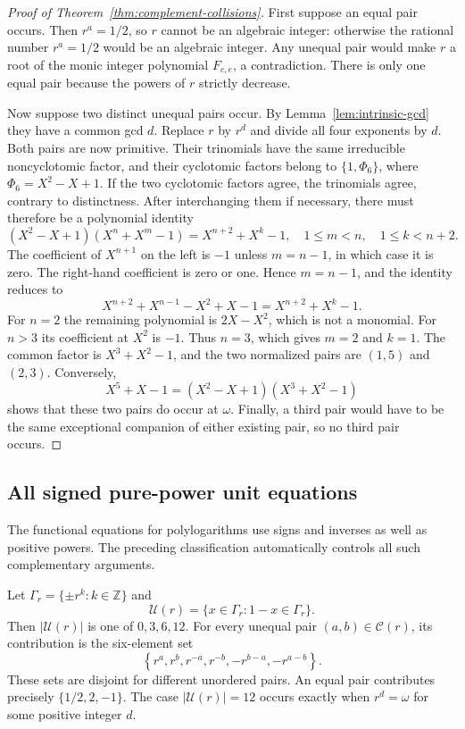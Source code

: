 \begin{proof}[Proof of Theorem~\ref{thm:complement-collisions}]
First suppose an equal pair occurs.  Then $r^a=1/2$, so $r$ cannot
be an algebraic integer: otherwise the rational number $r^a=1/2$
would be an algebraic integer.  Any unequal pair would make $r$ a
root of the monic integer polynomial $F_{c,e}$, a contradiction.
There is only one equal pair because the powers of $r$ strictly
decrease.

Now suppose two distinct unequal pairs occur.  By
Lemma~\ref{lem:intrinsic-gcd} they have a common gcd $d$.
Replace $r$ by $r^d$ and divide all four exponents by $d$.
Both pairs are now primitive.  Their trinomials have the same
irreducible noncyclotomic factor, and their cyclotomic factors belong
to $\{1,\Phi_6\}$, where $\Phi_6=X^2-X+1$.
If the two cyclotomic factors agree, the trinomials agree, contrary
to distinctness.  After interchanging them if necessary, there must
therefore be a polynomial identity
\begin{equation}
(X^2-X+1)(X^n+X^m-1)=X^{n+2}+X^k-1,
\quad 1\le m<n,\quad 1\le k<n+2.
\label{eq:primitive-collision-factor}
\end{equation}
The coefficient of $X^{n+1}$ on the left is $-1$ unless
$m=n-1$, in which case it is zero.  The right-hand coefficient is
zero or one.  Hence $m=n-1$, and the identity reduces to
\[
X^{n+2}+X^{n-1}-X^2+X-1=X^{n+2}+X^k-1.
\]
For $n=2$ the remaining polynomial is $2X-X^2$, which is not a
monomial.  For $n>3$ its coefficient at $X^2$ is $-1$.
Thus $n=3$, which gives $m=2$ and $k=1$.
The common factor is $X^3+X^2-1$, and the two normalized pairs are
$(1,5)$ and $(2,3)$.  Conversely,
\[
X^5+X-1=(X^2-X+1)(X^3+X^2-1)
\]
shows that these two pairs do occur at $\omega$.
Finally, a third pair would have to be the same exceptional companion
of either existing pair, so no third pair occurs.
\end{proof}

\subsection{All signed pure-power unit equations}

The functional equations for polylogarithms use signs and inverses as
well as positive powers.  The preceding classification automatically
controls all such complementary arguments.

\begin{corollary}
\label{cor:signed-unit-count}
Let $\Gamma_r=\{\pm r^k:k\in\mathbb Z\}$ and
\[
\mathcal U(r)=\{x\in\Gamma_r:1-x\in\Gamma_r\}.
\]
Then $|\mathcal U(r)|$ is one of $0,3,6,12$.
For every unequal pair $(a,b)\in\mathcal C(r)$, its contribution is
the six-element set
\begin{equation}
\left\{r^a,r^b,r^{-a},r^{-b},-r^{b-a},-r^{a-b}\right\}.
\label{eq:six-unit-orbit}
\end{equation}
These sets are disjoint for different unordered pairs.
An equal pair contributes precisely $\{1/2,2,-1\}$.
The case $|\mathcal U(r)|=12$ occurs exactly when $r^d=\omega$
for some positive integer $d$.
\end{corollary}

